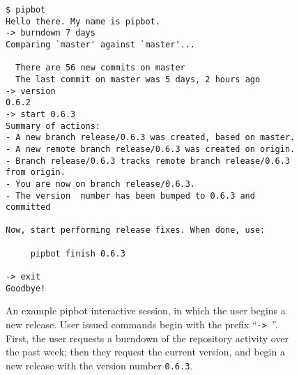 \begin{figure}[H]
\begin{verbatim}
$ pipbot
Hello there. My name is pipbot.
-> burndown 7 days
Comparing `master' against `master'...

  There are 56 new commits on master
  The last commit on master was 5 days, 2 hours ago
-> version
0.6.2
-> start 0.6.3
Summary of actions:
- A new branch release/0.6.3 was created, based on master.
- A new remote branch release/0.6.3 was created on origin.
- Branch release/0.6.3 tracks remote branch release/0.6.3 from origin.
- You are now on branch release/0.6.3.
- The version  number has been bumped to 0.6.3 and committed

Now, start performing release fixes. When done, use:

     pipbot finish 0.6.3

-> exit
Goodbye!
\end{verbatim}
\caption[Example pipbot session]
  {An example pipbot interactive session, in which the user begins a
   new release. User issued commands begin with the prefix
   ``\texttt{-> }''. First, the user requests a burndown of the
   repository activity over the past week; then they request the
   current version, and begin a new release with the version number
   \texttt{0.6.3}.}
\label{fig:pipbot-session}
\end{figure}

\lipsum[40-47]
